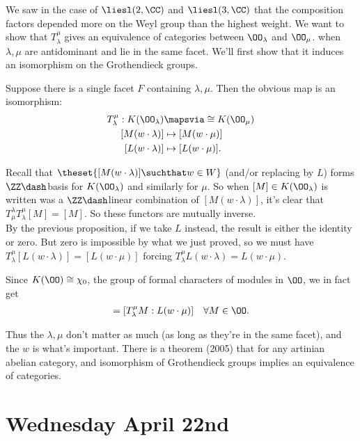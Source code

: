 We saw in the case of \(\liesl(2, \CC)\) and \(\liesl(3, \CC)\) that the
composition factors depended more on the Weyl group than the highest
weight. We want to show that \(T_\lambda^\mu\) gives an equivalence of
categories between \(\OO_\lambda\) and \(\OO_\mu\). when
\(\lambda, \mu\) are antidominant and lie in the same facet. We'll first
show that it induces an isomorphism on the Grothendieck groups.

\begin{description}
\tightlist
\item[Proposition (Isomorphism of Grothendieck Groups for Weights in a
Common Facet)]
Suppose there is a single facet \(F\) containing \(\lambda, \mu\). Then
the obvious map is an isomorphism: \begin{align*}
T_\lambda^\mu: K(\OO_\lambda) &\mapsvia\cong K(\OO_\mu)\\
[M(w\cdot \lambda)] &\mapsto [M(w\cdot \mu)] \\
[L(w\cdot \lambda)] &\mapsto [L(w\cdot \mu)]
.\end{align*}
\item[Proof]
Recall that \(\theset{[M(w\cdot \lambda)] \suchthat w\in W}\) (and/or
replacing by \(L\)) forms \(\ZZ\dash\)basis for \(K(\OO_\lambda)\) and
similarly for \(\mu\). So when \([M]\in K(\OO_\lambda)\) is written was
a \(\ZZ\dash\)linear combination of \([M(w\cdot \lambda)]\), it's clear
that \(T_\mu^\lambda T_\lambda^\mu [M] = [M]\). So these functors are
mutually inverse.\\
By the previous proposition, if we take \(L\) instead, the result is
either the identity or zero. But zero is impossible by what we just
proved, so we must have
\(T_\lambda^\mu [ L(w\cdot \lambda)] = [L(w\cdot \mu)]\) forcing
\(T_\lambda^\mu L(w\cdot \lambda) = L(w\cdot \mu)\).
\end{description}

Since \(K(\OO) \cong \chi_0\), the group of formal characters of modules
in \(\OO\), we in fact get \begin{align*}
[M: L(w\cdot \lambda)] = [T_\lambda^\mu M: L(w\cdot \mu)] \quad \forall M\in \OO
.\end{align*}

Thus the \(\lambda, \mu\) don't matter as much (as long as they're in
the same facet), and the \(w\) is what's important. There is a theorem
(2005) that for any artinian abelian category, and isomorphism of
Grothendieck groups implies an equivalence of categories.

\hypertarget{wednesday-april-22nd}{%
\section{Wednesday April 22nd}\label{wednesday-april-22nd}}

